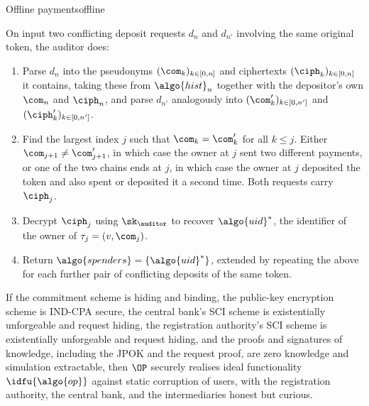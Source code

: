 \begin{protocolbox}{Offline payments}{offline}
\begin{description}
\begin{enumerate}
      \end{enumerate}

    \item[$\algo{spenders} \leftarrow \OPidentify(d_n, d_{n'})$ :] On input two
      conflicting deposit requests $d_n$ and $d_{n'}$ involving the same
      original token, the auditor does:

      \begin{enumerate}

        \item Parse $d_n$ into the pseudonyms $(\com_k)_{k \in [0, n]}$ and
          ciphertexts $(\ciph_k)_{k \in [0, n]}$ it contains, taking these from
          $\algo{hist}_n$ together with the depositor's own $\com_n$ and
          $\ciph_n$, and parse $d_{n'}$ analogously into $(\com'_k)_{k \in [0,
          n']}$ and $(\ciph'_k)_{k \in [0, n']}$.

        \item Find the largest index $j$ such that $\com_k = \com'_k$ for all
          $k \leq j$. Either $\com_{j+1} \neq \com'_{j+1}$, in which case the
          owner at $j$ sent two different payments, or one of the two chains
          ends at $j$, in which case the owner at $j$ deposited the token and
          also spent or deposited it a second time. Both requests carry
          $\ciph_j$.

        \item Decrypt $\ciph_j$ using $\sk_\auditor$ to recover $\algo{uid}^*$,
          the identifier of the owner of $\tau_j = (v, \com_j)$.

        \item Return $\algo{spenders} = \{\algo{uid}^*\}$, extended by repeating the
          above for each further pair of conflicting deposits of the same
          token.

      \end{enumerate}

  \end{description}

\end{protocolbox}

\begin{theorem}\label{thm:offline-construction-security}
  If the commitment scheme is hiding and binding, the public-key encryption
  scheme is IND-CPA secure, the central bank's SCI scheme is existentially
  unforgeable and request hiding, the registration authority's SCI scheme is
  existentially unforgeable and request hiding, and the proofs and signatures
  of knowledge, including the JPOK and the request proof, are zero knowledge
  and simulation extractable, then $\OP$ securely realises ideal functionality
  $\idfu{\algo{op}}$ against static corruption of users, with the registration
  authority, the central bank, and the intermediaries honest but curious.
%
\end{theorem}

